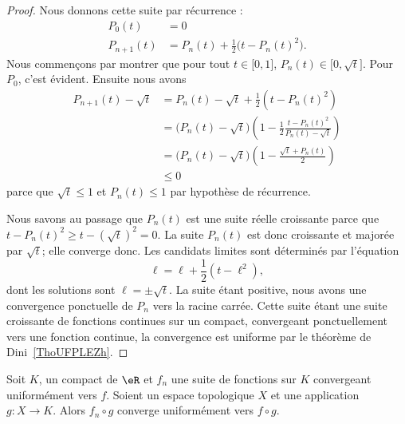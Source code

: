 \begin{proof}
	Nous donnons cette suite par récurrence :
	\begin{subequations}
		\begin{align}
			P_0(t)     & =0                                           \\
			P_{n+1}(t) & =P_n(t)+\frac{ 1 }{2}\big( t-P_n(t)^2 \big).
		\end{align}
	\end{subequations}
	Nous commençons par montrer que pour tout \( t\in \mathopen[ 0 , 1 \mathclose]\), \( P_n(t)\in\mathopen[ 0 , \sqrt{t} \mathclose]\). Pour \( P_0\), c'est évident. Ensuite nous avons
	\begin{subequations}
		\begin{align}
			P_{n+1}(t)-\sqrt{t} & =P_n(t)-\sqrt{t}+\frac{ 1 }{2}(t-P_n(t)^2)                                                       \\
			                    & =\big( P_n(t)-\sqrt{t} \big)\left( 1-\frac{ 1 }{2}\frac{ t-P_n(t)^2 }{ P_n(t)-\sqrt{t} } \right) \\
			                    & =\big( P_n(t)-\sqrt{t} \big)\left( 1-\frac{ \sqrt{t}+P_n(t) }{2} \right)                         \\
			                    & \leq 0
		\end{align}
	\end{subequations}
	parce que \( \sqrt{t} \leq 1\) et \( P_n(t)\leq 1\) par hypothèse de récurrence.

	Nous savons au passage que \( P_n(t)\) est une suite réelle croissante parce que \( t-P_n(t)^2\geq t-(\sqrt{t})^2=0\). La suite \( P_n(t)\) est donc croissante et majorée par \( \sqrt{t}\); elle converge donc. Les candidats limites sont déterminés par l'équation
	\begin{equation}
		\ell=\ell+\frac{ 1 }{2}(t-\ell^2),
	\end{equation}
	dont les solutions sont \( \ell=\pm\sqrt{t}\). La suite étant positive, nous avons une convergence ponctuelle de \( P_n\) vers la racine carrée. Cette suite étant une suite croissante de fonctions continues sur un compact, convergeant ponctuellement vers une fonction continue, la convergence est uniforme par le théorème de Dini~\ref{ThoUFPLEZh}.
\end{proof}

\begin{lemma}           \label{LemUuxcqY}
    Soit \( K\), un compact de \( \eR\) et \( f_n\) une suite de fonctions sur \( K\) convergeant uniformément vers \( f\). Soient un espace topologique \( X\) et une application \( g\colon X\to K\). Alors \( f_n\circ g\) converge uniformément vers \( f\circ g\).
\end{lemma}

